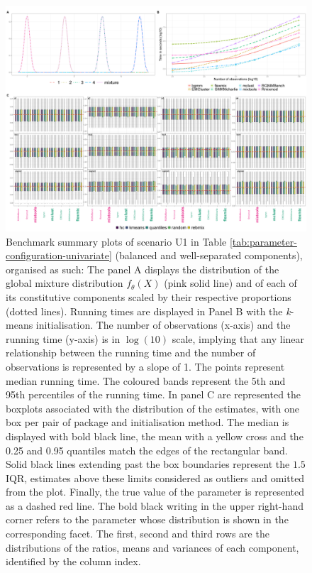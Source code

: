\begin{figure}

{\centering \includegraphics[width=1\linewidth]{./figs/univariate/univariate_balanced_separated} 

}

\caption{Benchmark summary plots of scenario U1 in Table \ref{tab:parameter-configuration-univariate} (balanced and well-separated components), organised as such:
The panel A displays the distribution of the global mixture distribution $f_{\theta}(X)$
(pink solid line) and of each of its constitutive components scaled by
their respective proportions (dotted lines).
Running times are displayed in Panel B with the \textit{k}-means initialisation. The number of observations
(x-axis) and the running time (y-axis) is in $\log(10)$ scale, implying
that any linear relationship between the running time and the number of
observations is represented by a slope of 1. The points represent median
running time. The coloured bands represent the 5th and 95th percentiles
of the running time.
In panel C are represented the boxplots associated with the distribution of the estimates, with one box per pair of package and initialisation method. The median is displayed with bold
black line, the mean with a yellow cross and the 0.25 and 0.95 quantiles
match the edges of the rectangular band. Solid black lines extending
past the box boundaries represent the $1.5$ IQR, estimates above these
limits considered as outliers and omitted from the plot. Finally, the
true value of the parameter is represented as a dashed red line. The bold black writing in the upper right-hand corner refers to the parameter whose distribution is shown in the corresponding facet. The first, second and third rows are the distributions of the ratios, means and variances of each component, identified by the column index.}\label{fig:four-component-balanced-separated}
\end{figure}

